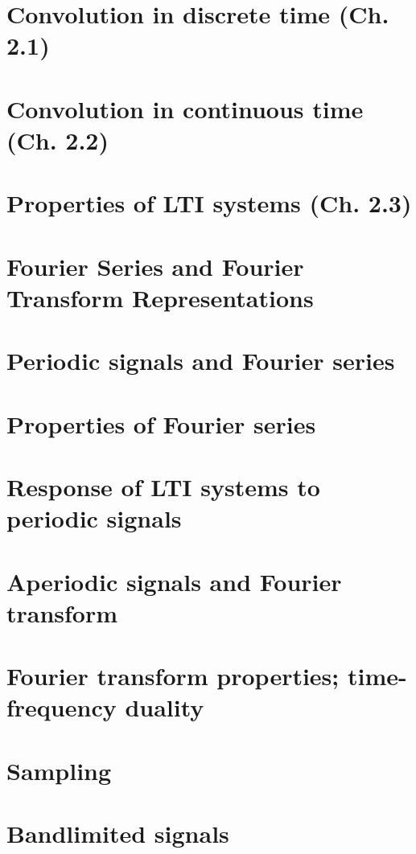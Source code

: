 \documentclass{article}
\begin{document}
\section{Convolution in discrete time (Ch. 2.1)}


\section{Convolution in continuous time (Ch. 2.2)}


\section{Properties of LTI systems (Ch. 2.3)} %


\section*{Fourier Series and Fourier Transform Representations}
\section{Periodic signals and Fourier series}
\section{Properties of Fourier series}
\section{Response of LTI systems to periodic signals}
\section{Aperiodic signals and Fourier transform}
\section{Fourier transform properties; time-frequency duality}

\section*{Sampling}
\section{Bandlimited signals}
\end{document}

